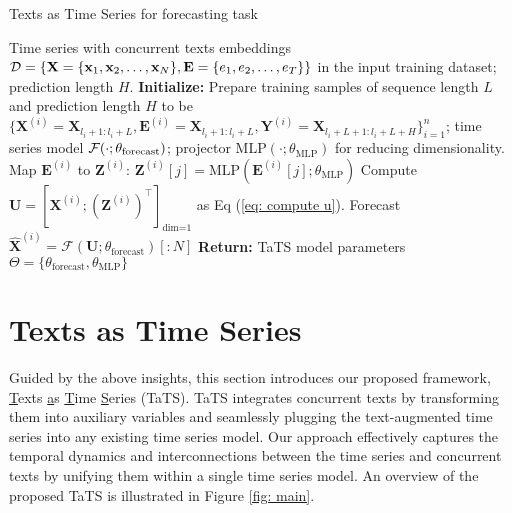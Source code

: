 \begin{algorithm}[t]
    \caption{Texts as Time Series for forecasting task}
    \label{alg:main}
\begin{algorithmic}[1]
    \REQUIRE 
    Time series with concurrent texts embeddings $\mathcal{D} = \{\mathbf{X} = \{\mathbf{x}_1, \mathbf{x}_2, \dots, \mathbf{x}_N\}, \mathbf{E} = \{e_1, e_2, \dots, e_T\}\}$ in the input training dataset; prediction length $H$.
    \STATE \textbf{Initialize:} 
    Prepare training samples of sequence length $L$ and prediction length $H$ to be $\{\bm{X}^{(i)} = \bm{X}_{l_i+1:l_i + L}, \bm{E}^{(i)}=\bm{X}_{l_i+1:l_i + L}, \bm{Y}^{(i)}=\bm{X}_{l_i+L+1:l_i+L+H}\}_{i=1}^n$;  time series model $\mathcal{F}(\cdot; \theta_{\text{forecast}})$; projector $\text{MLP}(\cdot; \theta_{\text{MLP}})$ for reducing dimensionality. 
        \STATE Map $\bm{E}^{(i)}$ to $\bm{Z}^{(i)}$: $\bm{Z}^{(i)}[j] = \text{MLP}(\bm{E}^{(i)}[j]; \theta_{\text{MLP}})$
        \STATE Compute $\bm{U} = [\bm{X}^{(i)}; {(\bm{Z}^{(i)})}^{\intercal}]_{\text{dim=1}}$ as Eq (\ref{eq: compute u}).
        \STATE Forecast $\widehat{\mathbf{X}}^{(i)} = \mathcal{F}\left(\mathbf{U}; \theta_{\text{forecast}}\right)[:N]$
        \STATE {}
        \ENDFOR
    \ENDWHILE
    \STATE \textbf{Return:} TaTS model parameters $\Theta=\{\theta_{\text{forecast}}, \theta_{\text{MLP}}\}$
\end{algorithmic}
\end{algorithm}


\section{Texts as Time Series}
Guided by the above insights, this section introduces our proposed framework, \underline{T}exts \underline{a}s \underline{T}ime \underline{S}eries (TaTS). TaTS integrates concurrent texts by transforming them into auxiliary variables and seamlessly plugging the text-augmented time series into any existing time series model. Our approach effectively captures the temporal dynamics and interconnections between the time series and concurrent texts by unifying them within a single time series model. An overview of the proposed TaTS is illustrated in Figure \ref{fig: main}.

